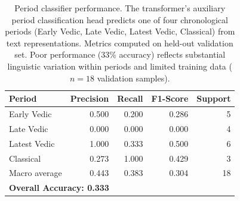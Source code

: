 \begin{table}[ht]
\centering
\caption{Period classifier performance. The transformer's auxiliary period classification head predicts one of four chronological periods (Early Vedic, Late Vedic, Latest Vedic, Classical) from text representations. Metrics computed on held-out validation set. Poor performance (33\% accuracy) reflects substantial linguistic variation within periods and limited training data ($n=18$ validation samples).}
\label{tab:period-classifier}
\begin{tabular}{lrrrr}
\toprule
\textbf{Period} & \textbf{Precision} & \textbf{Recall} & \textbf{F1-Score} & \textbf{Support} \\
\midrule
Early Vedic & 0.500 & 0.200 & 0.286 & 5 \\
Late Vedic & 0.000 & 0.000 & 0.000 & 4 \\
Latest Vedic & 1.000 & 0.333 & 0.500 & 6 \\
Classical & 0.273 & 1.000 & 0.429 & 3 \\
\midrule
Macro average & 0.443 & 0.383 & 0.304 & 18 \\
\midrule
\multicolumn{5}{l}{\textbf{Overall Accuracy: 0.333}} \\
\bottomrule
\end{tabular}
\end{table}